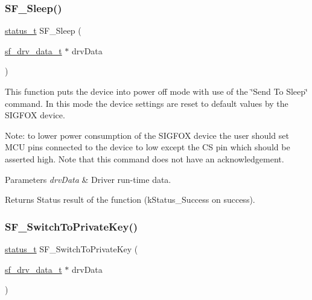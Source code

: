 \subsubsection{\texorpdfstring{SF\_Sleep()}{SF\_Sleep()}}
{\footnotesize\ttfamily \mbox{\hyperlink{group__ksdk__common_gaaabdaf7ee58ca7269bd4bf24efcde092}{status\+\_\+t}} S\+F\+\_\+\+Sleep (\begin{DoxyParamCaption}\item[{\mbox{\hyperlink{structsf__drv__data__t}{sf\+\_\+drv\+\_\+data\+\_\+t}} $\ast$}]{drv\+Data }\end{DoxyParamCaption})}



This function puts the device into power off mode with use of the \char`\"{}\+Send To Sleep\char`\"{} command. In this mode the device settings are reset to default values by the S\+I\+G\+F\+OX device. 

Note\+: to lower power consumption of the S\+I\+G\+F\+OX device the user should set M\+CU pins connected to the device to low except the CS pin which should be asserted high. Note that this command does not have an acknowledgement.


\begin{DoxyParams}{Parameters}
{\em drv\+Data} & Driver run-\/time data.\\
\hline
\end{DoxyParams}
\begin{DoxyReturn}{Returns}
Status result of the function (k\+Status\+\_\+\+Success on success). 
\end{DoxyReturn}
\mbox{\label{group__sf__functions__group_ga2901646dfa48cb95c2dca7f7459b64b0}} 
\subsubsection{\texorpdfstring{SF\_SwitchToPrivateKey()}{SF\_SwitchToPrivateKey()}}
{\footnotesize\ttfamily \mbox{\hyperlink{group__ksdk__common_gaaabdaf7ee58ca7269bd4bf24efcde092}{status\+\_\+t}} S\+F\+\_\+\+Switch\+To\+Private\+Key (\begin{DoxyParamCaption}\item[{\mbox{\hyperlink{structsf__drv__data__t}{sf\+\_\+drv\+\_\+data\+\_\+t}} $\ast$}]{drv\+Data }\end{DoxyParamCaption})}



